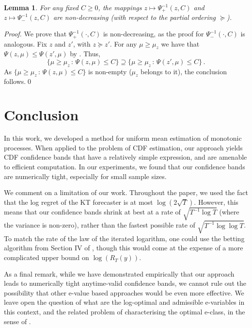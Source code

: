 \documentclass[3p, authoryear, 10pt]{elsarticle}%
\newtheorem{lemma}{Lemma}
\begin{document}
\begin{lemma}\label{lemma:monotonic}
    For any fixed $C\geq 0$, the mappings $z\mapsto\Psi^{-1}_+(z,C)$ and $z\mapsto\Psi^{-1}_-(z,C)$ are non-decreasing (with respect to the partial ordering $\succeq$).
\end{lemma}
\begin{proof}
    We prove that $\Psi^{-1}_+(\cdot,C)$ is non-decreasing, as the proof for $\Psi^{-1}_-(\cdot,C)$ is analogous. Fix $z$ and $z'$, with $z\succeq z'$. For any $\mu\geq\mu_z$ we have that $\Psi(z,\mu)\leq\Psi(z',\mu)$ by . Thus, $$\big\{\mu\geq\mu_z\,:\,\Psi(z,\mu)\leq C\big\} \supseteq \big\{\mu\geq\mu_z\,:\,\Psi(z',\mu)\leq C\big\}\,.$$ As $\{\mu\geq\mu_z\,:\,\Psi(z,\mu)\leq C\}$ is non-empty ($\mu_z$ belongs to it), the conclusion follows.\qed 
\end{proof}



\section{Conclusion}\label{sec:conc}

In this work, we developed a method for uniform mean estimation of monotonic processes. When applied to the problem of CDF estimation, our approach yields CDF confidence bands that have a relatively simple expression, and are amenable to efficient computation. In our experiments, we found that our confidence bands are numerically tight, especially for small sample sizes.

We comment on a limitation of our work. Throughout the paper, we used the fact that the log regret of the KT forecaster is at most $\log(2\sqrt{T})$. However, this means that our confidence bands shrink at best at a rate of $\sqrt{T^{-1}\log T}$ (where the variance is non-zero), rather than the fastest possible rate of $\sqrt{T^{-1}\log\log T}$. To match the rate of the law of the iterated logarithm, one could use the betting algorithm from Section IV of \cite{orabona2023tight}, though this would come at the expense of a more complicated upper bound on $\log(R_T(y))$.

As a final remark, while we have demonstrated empirically that our approach leads to numerically tight anytime-valid confidence bands, we cannot rule out the possibility that other e-value based approaches would be even more effective. We leave open the question of what are the log-optimal \citep{grunwald2024safe, larsson2024numeraire} and admissible \citep{ramdas2022admissible} e-variables in this context, and the related problem of characterising the optimal e-class, in the sense of \cite{clerico2024optimality,clerico2024optimal}.
\end{document}
